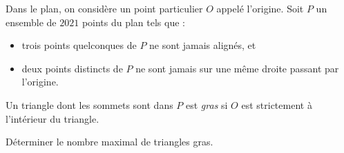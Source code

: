 Dans le plan, on considère un point particulier $O$ appelé l'origine. Soit $P$ un ensemble de $2021$ points du plan tels que :
\begin{itemize}
\item trois points quelconques de $P$ ne sont jamais alignés, et
\item deux points distincts de $P$ ne sont jamais sur une même droite passant par l'origine.
\end{itemize}
Un triangle dont les sommets sont dans $P$ est \emph{gras} si $O$ est strictement à l'intérieur du triangle.

Déterminer le nombre maximal de triangles gras.
